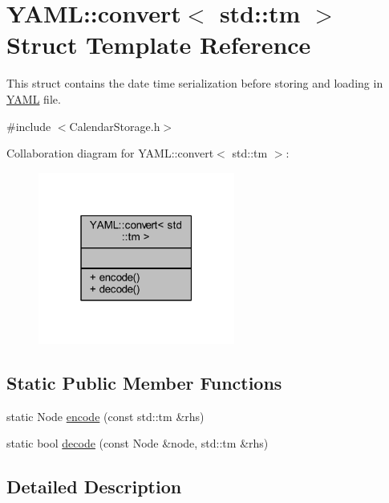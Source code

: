 \hypertarget{struct_y_a_m_l_1_1convert_3_01std_1_1tm_01_4}{}\section{Y\+A\+M\+L\+:\+:convert$<$ std\+:\+:tm $>$ Struct Template Reference}
\label{struct_y_a_m_l_1_1convert_3_01std_1_1tm_01_4}


This struct contains the date time serialization before storing and loading in \hyperlink{namespace_y_a_m_l}{Y\+A\+M\+L} file.  




{\ttfamily \#include $<$Calendar\+Storage.\+h$>$}



Collaboration diagram for Y\+A\+M\+L\+:\+:convert$<$ std\+:\+:tm $>$\+:\nopagebreak
\begin{figure}[H]
\begin{center}
\leavevmode
\includegraphics[width=183pt]{struct_y_a_m_l_1_1convert_3_01std_1_1tm_01_4__coll__graph}
\end{center}
\end{figure}
\subsection*{Static Public Member Functions}
\begin{DoxyCompactItemize}
\item 
static Node \hyperlink{struct_y_a_m_l_1_1convert_3_01std_1_1tm_01_4_a07440b7d6799934170be3ea677f77d43}{encode} (const std\+::tm \&rhs)
\item 
static bool \hyperlink{struct_y_a_m_l_1_1convert_3_01std_1_1tm_01_4_a7c8b7509772b8dc4ba46537749f90fec}{decode} (const Node \&node, std\+::tm \&rhs)
\end{DoxyCompactItemize}


\subsection{Detailed Description}
